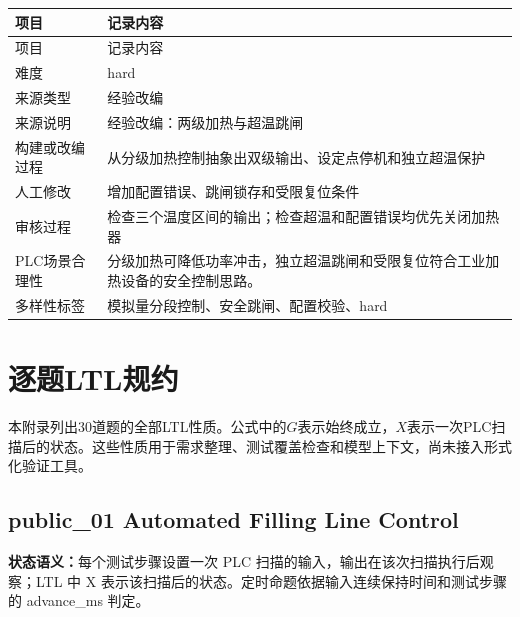 \begin{longtable}{L{3.0cm}L{10.3cm}}

\toprule

项目 & 记录内容\\

\midrule

\endfirsthead

\toprule

项目 & 记录内容\\

\midrule

\endhead

难度 & hard\\

来源类型 & 经验改编\\

来源说明 & 经验改编：两级加热与超温跳闸\\

构建或改编过程 & 从分级加热控制抽象出双级输出、设定点停机和独立超温保护\\

人工修改 & 增加配置错误、跳闸锁存和受限复位条件\\

审核过程 & 检查三个温度区间的输出；检查超温和配置错误均优先关闭加热器\\

PLC场景合理性 & 分级加热可降低功率冲击，独立超温跳闸和受限复位符合工业加热设备的安全控制思路。\\

多样性标签 & 模拟量分段控制、安全跳闸、配置校验、hard\\

\bottomrule

\end{longtable}

\section{逐题LTL规约}

本附录列出30道题的全部LTL性质。公式中的$G$表示始终成立，$X$表示一次PLC扫描后的状态。这些性质用于需求整理、测试覆盖检查和模型上下文，尚未接入形式化验证工具。

\subsection{{\ttfamily public\_01} Automated Filling Line Control}

\noindent\textbf{状态语义：}每个测试步骤设置一次 PLC 扫描的输入，输出在该次扫描执行后观察；LTL 中 X 表示该扫描后的状态。定时命题依据输入连续保持时间和测试步骤的 advance\_ms 判定。


